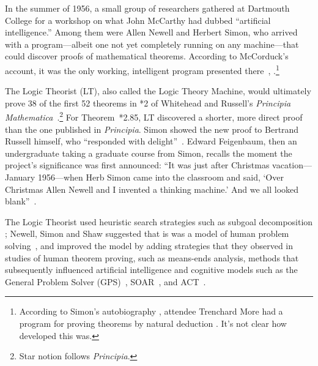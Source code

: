 \documentclass[journal]{IEEEtran}
\begin{document}
In the summer of 1956, a small group of researchers gathered at
Dartmouth College for a workshop on what John McCarthy had dubbed
``artificial intelligence.'' Among them were Allen Newell and Herbert
Simon, who arrived with a program---albeit one not yet completely running on any 
machine---that could discover proofs of mathematical theorems.
According to McCorduck's account, it was the only working,
intelligent program presented there~\cite[Ch.~13]{simon1996models},
\cite[p.~123]{mccorduck2004machines}.\footnote{According to
Simon's autobiography \cite[Ch.~13]{simon1996models},
attendee Trenchard More had a program for proving theorems
by natural deduction \cite{more1956,more1957,simon1999}.
It's not clear how developed this was.
}

The Logic Theorist (LT), also called the Logic Theory Machine, would 
ultimately prove 38 of the first 52 theorems in *2 of Whitehead 
and Russell's \textit{Principia Mathematica}~\cite{LT1957,whitehead1910principia}.\footnote{Star notion follows \textit{Principia}.}  
For Theorem~*2.85, LT discovered a shorter, more direct proof
than the one published in \textit{Principia}. Simon showed the new
proof to Bertrand Russell himself, who ``responded with
delight''~\cite[p.~167]{mccorduck2004machines}. Edward Feigenbaum,
then an undergraduate taking a graduate course from Simon, recalls the
moment the project's significance was first announced: ``It was just after Christmas vacation---January
1956---when Herb Simon came into the classroom and said, `Over
Christmas Allen Newell and I invented a thinking machine.' And we all
looked blank''~\cite[p.~138]{mccorduck2004machines}.

The Logic Theorist
used heuristic search strategies such as subgoal decomposition
\cite{LT1957}; Newell, Simon and Shaw suggested that is was a model of
human problem solving~\cite{HPS1958}, and improved the model by adding strategies
that they observed in studies of human theorem proving, such as means-ends analysis\cite{PCT1959}, methods that subsequently influenced artificial intelligence and cognitive models such as the General Problem Solver
(GPS)~\cite{newell1959gps}, SOAR~\cite{laird1991},
and ACT~\cite{anderson1993,anderson1996}.
\end{document}
